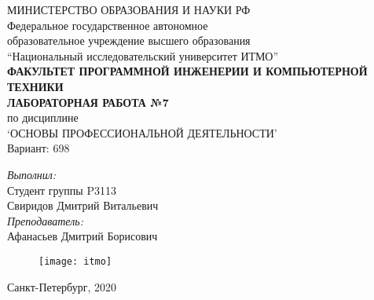 \begin{center}
МИНИСТЕРСТВО ОБРАЗОВАНИЯ И НАУКИ РФ\\
\hfill \break
Федеральное государственное автономное\\ 
образовательное учреждение высшего образования\\
``Национальный исследовательский университет ИТМО''\\
\hfill \break
\textbf{ФАКУЛЬТЕТ ПРОГРАММНОЙ ИНЖЕНЕРИИ И КОМПЬЮТЕРНОЙ ТЕХНИКИ}\\
\vspace{2.5cm}
\large{\textbf{ЛАБОРАТОРНАЯ РАБОТА №7}}\\
по дисциплине\\
\large{`ОСНОВЫ ПРОФЕССИОНАЛЬНОЙ ДЕЯТЕЛЬНОСТИ'}\\
\hfill \break
Вариант: 698\\
\end{center}

\vspace{8cm}
 
\begin{flushright}
\textit{Выполнил:}\\
Студент группы P3113\\
Свиридов Дмитрий Витальевич\\
\textit{Преподаватель:}\\
Афанасьев Дмитрий Борисович\\
\end{flushright}
 
\vfill

\begin{figure}[H]
\centering
\texttt{[image: itmo]}
\end{figure}
\begin{center} Санкт-Петербург, 2020 \end{center}

\thispagestyle{empty}
\newpage
